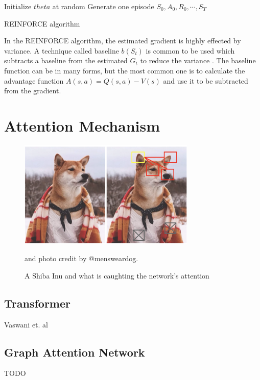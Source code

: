         \begin{algorithm}[H]
        \SetAlgoLined
         Initialize $theta$ at random\;
         Generate one episode $S_0, A_0, R_0, \cdots, S_T$\;
         \caption{REINFORCE algorithm}
        \end{algorithm}
        
        In the REINFORCE algorithm, the estimated gradient is highly effected by variance. A technique called baseline $b(S_t)$ is common to be used which subtracts a baseline from the estimated $G_t$ to reduce the variance \cite{baseline-artical}. The baseline function can be in many forms, but the most common one is to calculate the advantage function $A(s, a) = Q(s, a) - V(s)$ and use it to be subtracted from the gradient.

    \section{Attention Mechanism}\label{attention}
    
    \begin{figure}[ht]
        \centering
        \includegraphics[width=0.75\textwidth]{resources/theoretical-background/shiba-attention.png}
        \caption{A Shiba Inu and what is caughting the network's attention \cite{attention-weng}} and photo credit by @mensweardog.
        \label{fig:shiba}
    \end{figure}
    
    \cite{lstm}

        \subsection{Transformer}\label{transformer}
        Vaswani et. al \cite{attention-is-all}
    
        \subsection{Graph Attention Network}\label{graph-attention-network}
        TODO
    
    

